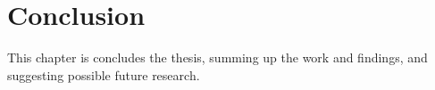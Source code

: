 \chapter{Conclusion}
This chapter is concludes the thesis, summing up the work and findings, and suggesting possible future research.
